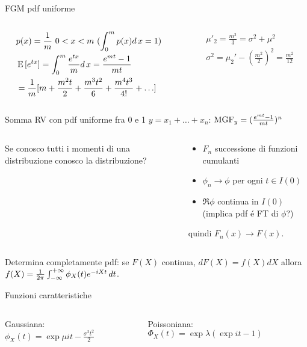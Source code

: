 \documentclass[asd-beamer.tex]{subfiles}
\begin{document}
\begin{wordonframe}{FGM pdf uniforme}
\begin{columns}[T]
\begin{column}{0.5\textwidth}
\begin{align*}
&p(x)=\frac{1}{m}\ 0<x<m\ (\int_0^mp(x)d\,x=1)\\
&\operatorname{E}{[e^{tx}]}=\int_0^m\frac{e^{tx}}{m}d\,x=\frac{e^{mt}-1}{mt}\\
&=\frac{1}{m}[m+\frac{m^2t}{2}+\frac{m^3t^2}{6}+\frac{m^4t^3}{4!}+\ldots]
\end{align*}
\end{column}
\begin{column}{0.5\textwidth}
\begin{align*}
&\mu'_2=\frac{m^2}{3}=\sigma^2+\mu^2\\
&\sigma^2=\mu_2'-(\frac{m^2}{2})^2=\frac{m^2}{12}
\end{align*}
\end{column}
\end{columns}
\begin{block}{Somma RV con pdf uniforme fra 0 e 1}
$y=x_1+\ldots+x_n$: $\operatorname{MGF}_y=(\frac{e^{mt}-1}{mt})^n$
\end{block}
\end{wordonframe}

\begin{frame}{}
	\begin{columns}[T]
		\begin{column}{0.3\textwidth}
			Se conosco tutti i momenti di una distribuzione conosco la distribuzione?
		\end{column}
		\begin{column}{0.7\textwidth}
			\begin{itemize}
				\item $F_n$ successione di funzioni cumulanti
				\item $\phi_n\to\phi$ per ogni $t\in I(0)$
				\item $\Re{\phi}$ continua in $I(0)$ (implica pdf \'e FT di $\phi$?)
			\end{itemize}
			quindi $F_n(x)\to F(x)$.
		\end{column}
	\end{columns}
Determina completamente pdf: se $F(X)$ continua, $dF(X)=f(X)dX$ allora $f(X)=\frac{1}{2\pi}\int_{-\infty}^{+\infty}{}\phi_X(t)e^{-iXt}\,dt$.
\end{frame}

\begin{wordonframe}{Funzioni caratteristiche}
\begin{columns}[T]
	\begin{column}{0.5\textwidth}
Gaussiana: $\phi_X(t)=\exp{\mu it-\frac{\sigma^2t^2}{2}}$
	\end{column}
	\begin{column}{0.5\textwidth}
Poissoniana: $\Phi_X(t)=\exp{\lambda(\exp{it}-1)}$
	\end{column}
\end{columns}
\end{wordonframe}
\end{document}
